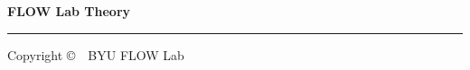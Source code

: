 
\thispagestyle{empty}
\begin{flushleft}
\Huge\bfseries\sffamily FLOW Lab Theory
\end{flushleft}
\noindent\rule{\linewidth}{1pt}
\vspace{8in}
\begin{flushleft}
Copyright \copyright\ \the\year\ BYU FLOW Lab
\end{flushleft}




\setcounter{tocdepth}{1}
\setcounter{secnumdepth}{-1}
\tableofcontents 

